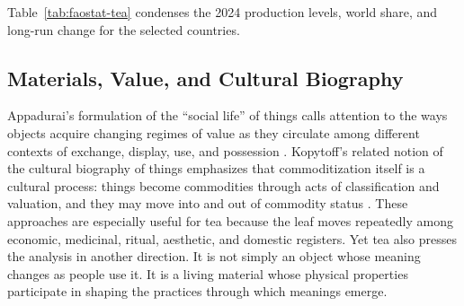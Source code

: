 \documentclass[numbers]{IntechOpen-Book}
\begin{document}
Table~\ref{tab:faostat-tea} condenses the 2024 production levels, world share, and long-run change for the selected countries.

\begin{table}[t]
\end{table}

\subsection{Materials, Value, and Cultural Biography}

Appadurai's formulation of the ``social life'' of things calls attention to the ways objects acquire changing regimes of value as they circulate among different contexts of exchange, display, use, and possession \cite{appadurai}. Kopytoff's related notion of the cultural biography of things emphasizes that commoditization itself is a cultural process: things become commodities through acts of classification and valuation, and they may move into and out of commodity status \cite{kopytoff}. These approaches are especially useful for tea because the leaf moves repeatedly among economic, medicinal, ritual, aesthetic, and domestic registers. Yet tea also presses the analysis in another direction. It is not simply an object whose meaning changes as people use it. It is a living material whose physical properties participate in shaping the practices through which meanings emerge.
\end{document}
